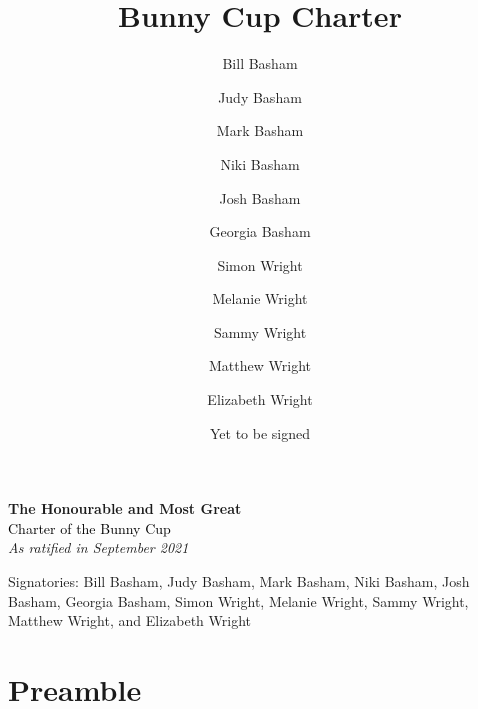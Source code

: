 \documentclass[a4paper]{article}
\title{Bunny Cup Charter}
\author{Bill Basham \and Judy Basham \and Mark Basham \and Niki Basham \and Josh Basham \and Georgia Basham \and Simon Wright \and Melanie Wright \and  Sammy Wright \and Matthew Wright \and Elizabeth Wright}
\date{Yet to be signed}
\begin{document}
\begin{titlepage} %

	\raggedleft %
	
	\vspace*{\baselineskip} %
	
	

	
	
	
	\textbf{\LARGE The Honourable and Most Great}\\[\baselineskip] %
	
	{\textcolor{Black}{\Huge Charter of the Bunny Cup}}\\[\baselineskip] %
	
	{\Large \textit{As ratified in September 2021}} %
	
	\vfill %
	
		{\Large Signatories: Bill Basham, Judy Basham,  Mark Basham,  Niki Basham,  Josh Basham, Georgia Basham, Simon Wright,  Melanie Wright,  Sammy Wright, Matthew Wright, and Elizabeth Wright} %
	
	\vspace*{3\baselineskip} %

\end{titlepage}

\section*{Preamble}
\end{document}
